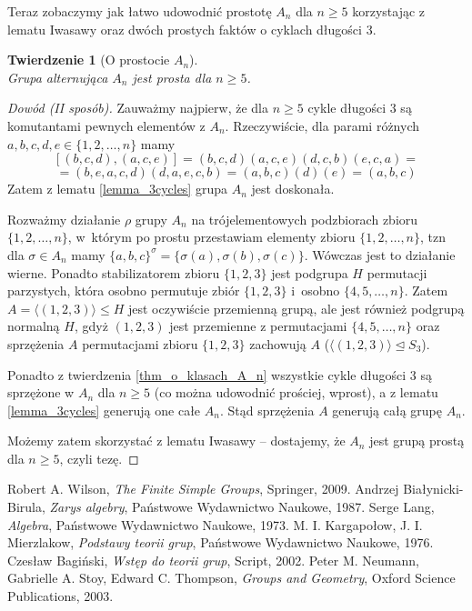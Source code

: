 \documentclass[licencjacka]{pracamgr}
\newtheorem{thh}{Twierdzenie}[section]
\begin{document}
Teraz zobaczymy jak łatwo udowodnić prostotę $A_n$ dla $n \ge 5$ korzystając z lematu Iwasawy 
oraz dwóch prostych faktów o cyklach długości 3.

\addtocounter{chapter}{-2}
\begin{thh}[O prostocie $A_n$] $ $ \\
    Grupa alternująca $A_n$ jest prosta dla $n \ge 5$.
\end{thh}
\begin{proof}[Dowód (II sposób)]
  Zauważmy najpierw, że dla $n \ge 5$ cykle długości 3 są komutantami pewnych elementów z $A_n$.
  Rzeczywiście, dla parami różnych $a, b, c, d, e \in \{ 1, 2, \ldots, n \}$ mamy
  $$ [(b, c, d),(a, c, e)] = (b, c, d)(a, c, e)(d, c, b)(e, c, a) = $$
  $$ = (b, e, a, c, d)(d, a, e, c, b) = (a, b, c)(d)(e) = (a, b, c)$$
  Zatem z lematu \ref{lemma_3cycles} grupa $A_n$ jest doskonała.

  Rozważmy działanie $\rho$ grupy $A_n$ na trójelementowych podzbiorach zbioru $\{ 1, 2, \ldots, n \}$,
  w~którym po prostu przestawiam elementy zbioru $\{1, 2, \ldots, n\}$, 
  tzn dla $\sigma \in A_n$ mamy $\{a, b, c \}^\sigma = \{ \sigma(a), \sigma(b), \sigma(c) \}$.
  Wówczas jest to działanie wierne.
  Ponadto stabilizatorem zbioru $\{1, 2, 3\}$ jest podgrupa $H$ permutacji parzystych, 
  która osobno permutuje zbiór $\{1, 2, 3\}$ i~osobno $\{4, 5, \ldots, n\}$.
  Zatem $A =  \langle (1, 2, 3)  \rangle \le H$ jest oczywiście przemienną grupą,
  ale jest również podgrupą normalną $H$, gdyż $(1, 2, 3)$ jest przemienne z permutacjami $\{4, 5, \ldots, n\}$
  oraz sprzężenia $A$ permutacjami zbioru $\{1, 2, 3\}$ zachowują $A$ ($\langle (1, 2, 3)  \rangle \unlhd S_3$).
  
  Ponadto z twierdzenia \ref{thm_o_klasach_A_n} wszystkie cykle długości 3 są sprzężone w $A_n$ dla $n \ge 5$
  (co można udowodnić prościej, wprost), a z lematu \ref{lemma_3cycles} generują one całe $A_n$.
  Stąd sprzężenia $A$ generują całą grupę $A_n$.

  Możemy zatem skorzystać z lematu Iwasawy -- dostajemy, że $A_n$ jest grupą prostą dla $n \ge 5$, czyli tezę.
\end{proof}


\addtocounter{chapter}{2}


\begin{thebibliography}{99}

 Robert A. Wilson, \textit{The Finite Simple Groups}, Springer, 2009.
 Andrzej Białynicki-Birula, \textit{Zarys algebry}, Państwowe Wydawnictwo Naukowe, 1987.
 Serge Lang, \textit{Algebra}, Państwowe Wydawnictwo Naukowe, 1973.
 M. I. Kargapołow, J. I. Mierzlakow, \textit{Podstawy teorii grup}, Państwowe Wydawnictwo Naukowe, 1976.
 Czesław Bagiński, \textit{Wstęp do teorii grup}, Script, 2002.
 Peter M. Neumann, Gabrielle A. Stoy, Edward C. Thompson, \textit{Groups and Geometry}, Oxford Science Publications, 2003.

\end{thebibliography}
\end{document}
